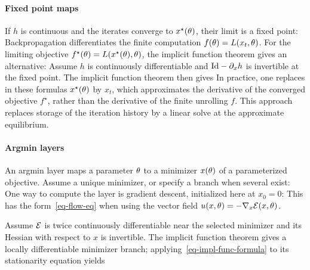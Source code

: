 \paragraph{Fixed point maps}

If $h$ is continuous and the iterates converge to $x^\star(\theta)$, their limit is a fixed point:
Backpropagation differentiates the finite computation $f(\theta) = L(x_t,\theta)$. For the limiting objective $f^\star(\theta) = L(x^\star(\theta),\theta)$, the implicit function theorem gives an alternative:
Assume $h$ is continuously differentiable and $\mathrm{Id}-\partial_xh$ is invertible at the fixed point. The implicit function theorem then gives
In practice, one replaces in these formulas $x^\star(\theta)$ by $x_t$, which approximates the derivative of the converged objective $f^\star$, rather than the derivative of the finite unrolling $f$.
%
This approach replaces storage of the iteration history by a linear solve at the approximate equilibrium.



\paragraph{Argmin layers}

An argmin layer maps a parameter $\theta$ to a minimizer $x(\theta)$ of a parameterized objective. Assume a unique minimizer, or specify a branch when several exist:
One way to compute the layer is gradient descent, initialized here at $x_0=0$:
This has the form~\eqref{eq-flow-eq} when using the vector field $u(x,\theta)=-\nabla_x\mathcal{E}(x,\theta)$.

Assume $\mathcal{E}$ is twice continuously differentiable near the selected minimizer and its Hessian with respect to $x$ is invertible. The implicit function theorem gives a locally differentiable minimizer branch; applying~\eqref{eq-impl-func-formula} to its stationarity equation yields

